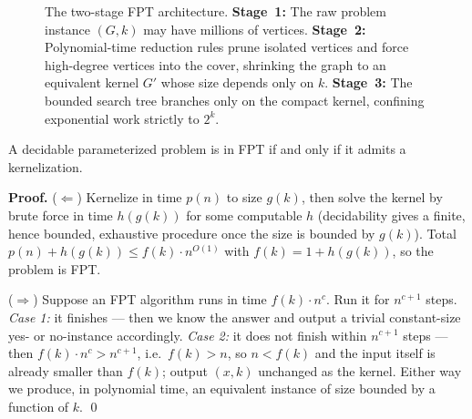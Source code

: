\begin{figure}[H]
\caption{The two-stage FPT architecture. \textbf{Stage~1:} The raw problem instance $(G,k)$ may have millions of vertices. \textbf{Stage~2:} Polynomial-time reduction rules prune isolated vertices and force high-degree vertices into the cover, shrinking the graph to an equivalent kernel $G'$ whose size depends only on $k$. \textbf{Stage~3:} The bounded search tree branches only on the compact kernel, confining exponential work strictly to $2^k$.}
\label{ch25:fig-fpt-pipeline}
\end{figure}

\begin{theorem}\label{ch25:thm-kernel-iff}
A decidable parameterized problem is in FPT if and only if it admits a kernelization.
\end{theorem}

\begin{whybox}
\textbf{Proof.} ($\Leftarrow$) Kernelize in time $p(n)$ to size $g(k)$, then solve the kernel by brute force in time $h(g(k))$ for some computable $h$ (decidability gives a finite, hence bounded, exhaustive procedure once the size is bounded by $g(k)$). Total $p(n)+h(g(k))\le f(k)\cdot n^{O(1)}$ with $f(k)=1+h(g(k))$, so the problem is FPT.

($\Rightarrow$) Suppose an FPT algorithm runs in time $f(k)\cdot n^c$. Run it for $n^{c+1}$ steps. \emph{Case 1:} it finishes --- then we know the answer and output a trivial constant-size yes- or no-instance accordingly. \emph{Case 2:} it does not finish within $n^{c+1}$ steps --- then $f(k)\cdot n^c > n^{c+1}$, i.e.\ $f(k) > n$, so $n < f(k)$ and the input itself is already smaller than $f(k)$; output $(x,k)$ unchanged as the kernel. Either way we produce, in polynomial time, an equivalent instance of size bounded by a function of $k$. \qed
\end{whybox}

